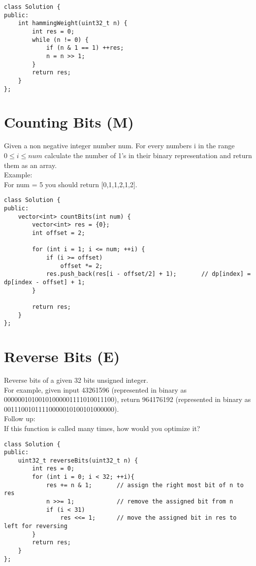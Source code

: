 \begin{lstlisting}
class Solution {
public:
    int hammingWeight(uint32_t n) {
        int res = 0;
        while (n != 0) {
            if (n & 1 == 1) ++res;
            n = n >> 1;
        }
        return res;
    }
};
\end{lstlisting}


\section{Counting Bits (M)}
Given a non negative integer number num. For every numbers i in the range $0 \leq i \leq num$ calculate the number of 1's in their binary representation and return them as an array.\\

Example:\\
For num = 5 you should return [0,1,1,2,1,2]. \\

\begin{lstlisting}
class Solution {
public:
    vector<int> countBits(int num) {
        vector<int> res = {0};
        int offset = 2;
        
        for (int i = 1; i <= num; ++i) {                
            if (i >= offset)
                offset *= 2;
            res.push_back(res[i - offset/2] + 1);       // dp[index] = dp[index - offset] + 1;
        }
        
        return res;
    }
};
\end{lstlisting}


\section{Reverse Bits (E)}
Reverse bits of a given 32 bits unsigned integer.\\

For example, given input 43261596 (represented in binary as 00000010100101000001111010011100), return 964176192 (represented in binary as 00111001011110000010100101000000).\\

Follow up:\\
If this function is called many times, how would you optimize it? \\

\begin{lstlisting}
class Solution {
public:
    uint32_t reverseBits(uint32_t n) {
        int res = 0;
        for (int i = 0; i < 32; ++i){
            res += n & 1;       // assign the right most bit of n to res
            n >>= 1;            // remove the assigned bit from n
            if (i < 31)
                res <<= 1;      // move the assigned bit in res to left for reversing
        }
        return res;
    }
};
\end{lstlisting}


